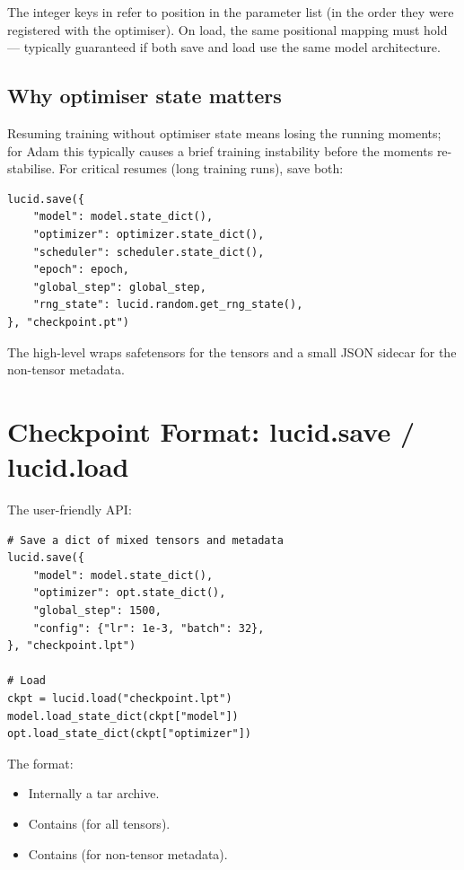 The integer keys in  refer to position in the
parameter list (in the order they were registered with the
optimiser). On load, the same positional mapping must hold ---
typically guaranteed if both save and load use the same
model architecture.

\subsection{Why optimiser state matters}
\label{ssec:serialization:optimizer_state_matters}

Resuming training without optimiser state means losing the
running moments; for Adam this typically causes a brief
training instability before the moments re-stabilise. For
critical resumes (long training runs), save both:

\begin{lstlisting}[style=lucid,language=LucidPython]
lucid.save({
    "model": model.state_dict(),
    "optimizer": optimizer.state_dict(),
    "scheduler": scheduler.state_dict(),
    "epoch": epoch,
    "global_step": global_step,
    "rng_state": lucid.random.get_rng_state(),
}, "checkpoint.pt")
\end{lstlisting}

The high-level  wraps safetensors for the
tensors and a small JSON sidecar for the non-tensor metadata.

\section{Checkpoint Format: lucid.save / lucid.load}
\label{sec:serialization:lucid_save}

The user-friendly API:

\begin{lstlisting}[style=lucid,language=LucidPython]
# Save a dict of mixed tensors and metadata
lucid.save({
    "model": model.state_dict(),
    "optimizer": opt.state_dict(),
    "global_step": 1500,
    "config": {"lr": 1e-3, "batch": 32},
}, "checkpoint.lpt")

# Load
ckpt = lucid.load("checkpoint.lpt")
model.load_state_dict(ckpt["model"])
opt.load_state_dict(ckpt["optimizer"])
\end{lstlisting}

The  format:
\begin{itemize}
  \item Internally a tar archive.
  \item Contains  (for all tensors).
  \item Contains  (for non-tensor metadata).
\end{itemize}

